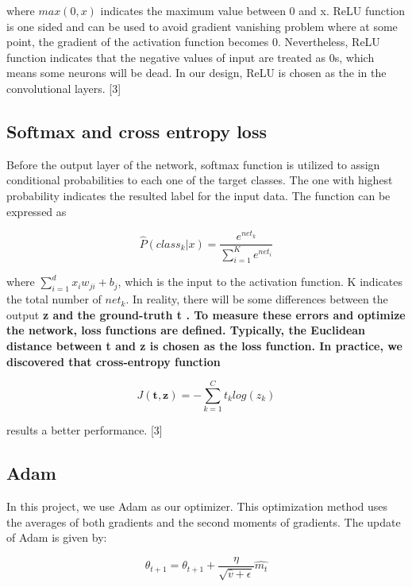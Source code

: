 \documentclass[twoside,twocolumn,10.8pt]{article}
\begin{document}
\noindent where $max(0,x)$ indicates the maximum value between 0 and x. ReLU function is one sided and can be used to avoid gradient vanishing problem where at some point, the gradient of the activation function becomes 0. Nevertheless, ReLU function indicates that the negative values of input are treated as 0s, which means some neurons will be dead. In our design, ReLU is chosen as the in the convolutional layers. [3]

\subsection{Softmax and cross entropy loss}

Before the output layer of the network, softmax function is utilized to assign conditional probabilities to each one of 
the target classes. The one with highest probability indicates the resulted label for the input data. The function can be expressed as 

\begin{equation}
\label{eq:2}
\widehat{P}(class_{k}|x)=\frac{e^{net_k}}{\sum_{i=1}^{K}e^{net_i}}
\end{equation}

\noindent where $\sum_{i=1}^{d}x_iw_{ji}+b_j$, which is the input to the activation function. K indicates the total number of $net_k$. In reality, there will be some differences between the output \bf z \rm and the ground-truth \bf t \rm. To measure these errors and optimize the network, loss functions are defined. Typically, the Euclidean distance between \bf t \rm and \bf z \rm is chosen as the loss function. In practice, we discovered that cross-entropy function 

\begin{equation}
\label{eq:3}
J(\mathbf{t,z})=-\sum_{k=1}^{C}t_klog(z_k)
\end{equation}

\noindent results a better performance. [3]

\subsection{Adam}

In this project, we use Adam as our optimizer.  This optimization method uses the averages of both gradients and the second moments of gradients. The update of Adam is given by: 

\begin{equation}
\label{eq:4}
\theta _{t+1}=\theta_{t+1}+\frac{\eta}{\sqrt{\hat{v}+\epsilon }}\widehat{m_t}
\end{equation}
\end{document}

